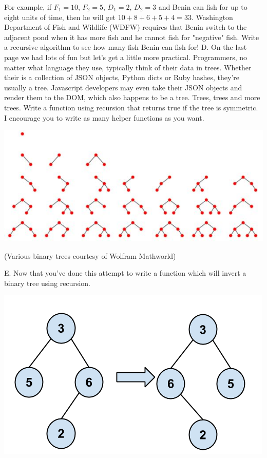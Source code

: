 \documentclass[12pt]{article}
\begin{document}
For example, if $F_1 = 10$, $F_2 = 5$, $D_1 = 2$, $D_2 = 3$ and Benin can fish for up to eight units of time, then he will get $10 + 8 + 6 + 5 + 4 = 33$.
Washington Department of Fish and Wildlife (WDFW) requires that Benin switch to the adjacent pond when it has more fish and he cannot fish for "negative" fish.
Write a recursive algorithm to see how many fish Benin can fish for!
\newpage
\noindent D. On the last page we had lots of fun but let's get a little more practical. Programmers, no matter what language they use, typically think of their data in trees. Whether their is a collection of JSON objects, Python dicts or Ruby hashes, they're usually a tree. Javascript developers may even take their JSON objects and render them to the DOM, which also happens to be a tree. Trees, trees and more trees. Write a function using recursion that returns true if the tree is symmetric. I encourage you to write as many helper functions as you want.\\
\centerline{\includegraphics[scale = 0.5]{binarytree.jpg}}
\centerline{(Various binary trees courtesy of Wolfram Mathworld)}
\newpage
\noindent E. Now that you've done this attempt to write a function which will invert a binary tree using recursion.\\
\centerline{\includegraphics[scale = 0.4]{invertbtree.png}}
\end{document}
